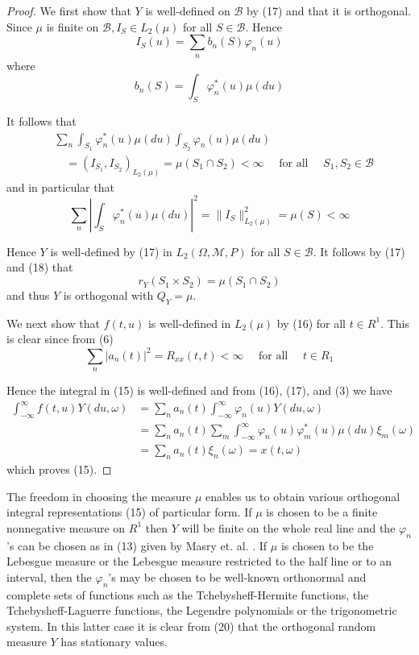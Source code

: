 \documentclass{article}
\begin{document}
\begin{proof}
We first show that $Y$ is well-defined on $\mathscr{B}$ by (17) and that it is orthogonal. Since $\mu$ is finite on $\mathscr{B}, I_{S} \in L_{2}(\mu)$ for all $S \in \mathscr{B}$. Hence
\[
I_{S}(u)=\sum_{n} b_{n}(S) \varphi_{n}(u)
\]
where
\[
b_{n}(S)=\int_{S} \varphi_{n}^{*}(u) \mu(d u)
\]

It follows that
\[
\begin{aligned}
&\sum_{n} \int_{S_{1}} \varphi_{n}^{*}(u) \mu(d u) \int_{S_{2}} \varphi_{n}(u) \mu(d u) \\
&\quad=(I_{S_{1}}, I_{S_{2}})_{L_{2}(\mu)}=\mu(S_{1} \cap S_{2})<\infty \quad \text{ for all } \quad S_{1}, S_{2} \in \mathscr{B}
\end{aligned}
\]
and in particular that
\[
\sum_{n}\left|\int_{S} \varphi_{n}^{*}(u) \mu(d u)\right|^{2}=\|I_{S}\|_{L_{2}(\mu)}^{2}=\mu(S)<\infty
\]

Hence $Y$ is well-defined by (17) in $L_{2}(\Omega, \mathscr{M}, P)$ for all $S \in \mathscr{B}$. It follows by (17) and (18) that
\[
r_{Y}(S_{1} \times S_{2})=\mu(S_{1} \cap S_{2})
\]
and thus $Y$ is orthogonal with $Q_{Y}=\mu$.

We next show that $f(t, u)$ is well-defined in $L_{2}(\mu)$ by (16) for all $t \in R^{1}$. This is clear since from (6)
\[
\sum_{n}|a_{n}(t)|^{2}=R_{x x}(t, t)<\infty \quad \text{ for all } \quad t \in R_{1}
\]

Hence the integral in (15) is well-defined and from (16), (17), and (3) we have
\[
\begin{aligned}
\int_{-\infty}^{\infty} f(t, u) Y(d u, \omega) &=\sum_{n} a_{n}(t) \int_{-\infty}^{\infty} \varphi_{n}(u) Y(d u, \omega) \\
&=\sum_{n} a_{n}(t) \sum_{m} \int_{-\infty}^{\infty} \varphi_{n}(u) \varphi_{m}^{*}(u) \mu(d u) \xi_{m}(\omega) \\
&=\sum_{n} a_{n}(t) \xi_{n}(\omega)=x(t, \omega)
\end{aligned}
\]
which proves (15).
\end{proof}

The freedom in choosing the measure $\mu$ enables us to obtain various orthogonal integral representations (15) of particular form. If $\mu$ is chosen to be a finite nonnegative measure on $R^{1}$ then $Y$ will be finite on the whole real line and the $\varphi_{n}$'s can be chosen as in (13) given by Masry et. al. \cite{masry1968}. If $\mu$ is chosen to be the Lebesgue measure or the Lebesgue measure restricted to the half line or to an interval, then the $\varphi_{n}$'s may be chosen to be well-known orthonormal and complete sets of functions such as the Tchebysheff-Hermite functions, the Tchebysheff-Laguerre functions, the Legendre polynomials or the trigonometric system. In this latter case it is clear from (20) that the orthogonal random measure $Y$ has stationary values.
\end{document}
